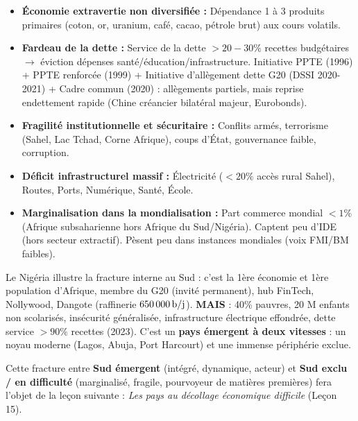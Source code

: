 \documentclass[11pt]{article}
\begin{document}
\begin{propriete}
\begin{itemize}
\item \textbf{Économie extravertie non diversifiée :} Dépendance 1 à 3 produits primaires (coton, or, uranium, café, cacao, pétrole brut) aux cours volatils.
\item \textbf{Fardeau de la dette :} Service de la dette $> 20-30\%$ recettes budgétaires $\to$ éviction dépenses santé/éducation/infrastructure. Initiative PPTE (1996) + PPTE renforcée (1999) + Initiative d'allègement dette G20 (DSSI 2020-2021) + Cadre commun (2020) : allègements partiels, mais reprise endettement rapide (Chine créancier bilatéral majeur, Eurobonds).
\item \textbf{Fragilité institutionnelle et sécuritaire :} Conflits armés, terrorisme (Sahel, Lac Tchad, Corne Afrique), coups d'État, gouvernance faible, corruption.
\item \textbf{Déficit infrastructurel massif :} Électricité ($< 20\%$ accès rural Sahel), Routes, Ports, Numérique, Santé, École.
\item \textbf{Marginalisation dans la mondialisation :} Part commerce mondial $< 1\%$ (Afrique subsaharienne hors Afrique du Sud/Nigéria). Captent peu d'IDE (hors secteur extractif). Pèsent peu dans instances mondiales (voix FMI/BM faibles).
\end{itemize}
\end{propriete}

\begin{exemplebox}
Le Nigéria illustre la fracture interne au Sud : c'est la 1ère économie et 1ère population d'Afrique, membre du G20 (invité permanent), hub FinTech, Nollywood, Dangote (raffinerie $\SI{650\,000}{b/j}$). \textbf{MAIS} : 40\% pauvres, 20 M enfants non scolarisés, insécurité généralisée, infrastructure électrique effondrée, dette service $> 90\%$ recettes (2023). C'est un \textbf{pays émergent à deux vitesses} : un noyau moderne (Lagos, Abuja, Port Harcourt) et une immense périphérie exclue.
\end{exemplebox}

Cette fracture entre \textbf{Sud émergent} (intégré, dynamique, acteur) et \textbf{Sud exclu / en difficulté} (marginalisé, fragile, pourvoyeur de matières premières) fera l'objet de la leçon suivante : \emph{Les pays au décollage économique difficile} (Leçon 15).
\end{document}
